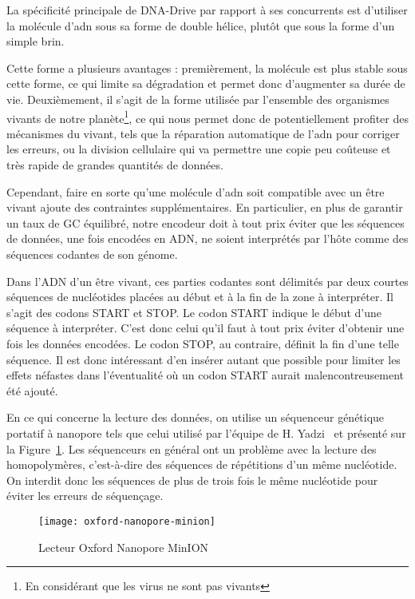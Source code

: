 \documentclass[a4paper]{report}
\begin{document}
La spécificité principale de DNA-Drive par rapport à ses concurrents
est d'utiliser la molécule d'\ac{adn} sous sa forme de double hélice,
plutôt que sous la forme d'un simple brin.

Cette forme a plusieurs avantages : 
premièrement, la molécule est plus stable sous cette forme,
ce qui limite sa dégradation et permet donc d'augmenter sa durée de vie.
Deuxièmement, il s'agit de la forme utilisée par l'ensemble des organismes vivants
de notre planète\footnote{En considérant que les virus ne sont pas vivants},
ce qui nous permet donc de potentiellement profiter des mécanismes du vivant,
tels que la réparation automatique de l’\ac{adn} pour corriger les erreurs,
ou la division cellulaire qui va permettre une copie peu coûteuse et très rapide de grandes quantités de données.

Cependant, faire en sorte qu'une molécule d'\ac{adn} soit compatible avec un être vivant ajoute des contraintes supplémentaires.
En particulier, en plus de garantir un taux de GC équilibré,
notre encodeur doit à tout prix éviter que les séquences de données, une fois encodées en ADN,
ne soient interprétés par l'hôte comme des séquences codantes de son génome.

Dans l'ADN d'un être vivant, ces parties codantes sont délimités par
deux courtes séquences de nucléotides placées au début et à la fin de la zone à interpréter.
Il s'agit des codons START et STOP.
Le codon START indique le début d'une séquence à interpréter.
C'est donc celui qu'il faut à tout prix éviter d'obtenir une fois les données encodées.
Le codon STOP, au contraire, définit la fin d'une telle séquence.
Il est donc intéressant d'en insérer autant que possible pour limiter les effets néfastes
dans l'éventualité où un codon START aurait malencontreusement été ajouté.

En ce qui concerne la lecture des données, on utilise un séquenceur génétique portatif à
nanopore tels que celui utilisé par l’équipe de H. Yadzi~\cite{yazdi2017portable} et présenté sur la Figure~\ref{fig:oxford-nanopore-minion}.
Les séquenceurs en général ont un problème avec la lecture des homopolymères, c’est-à-dire des
séquences de répétitions d’un même nucléotide. On interdit donc les séquences de plus de trois fois
le même nucléotide pour éviter les erreurs de séquençage.

\begin{figure}[ht]
\centering
\texttt{[image: oxford-nanopore-minion]}
\caption{Lecteur Oxford Nanopore MinION}
\label{fig:oxford-nanopore-minion}
\end{figure}
\end{document}

